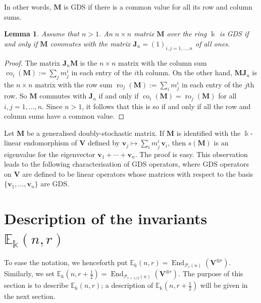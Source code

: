 \documentclass[10pt]{article}
\newtheorem{lemm}[theorem]{Lemma}
\theoremstyle{definition}
\DeclareMathOperator{\End}{End}
\DeclareMathOperator{\co}{co}
\DeclareMathOperator{\ro}{ro}
\newcommand{\E}{\mathbb{E}}
\newcommand{\Ptn}{\mathcal{P}}
\newcommand{\bM}{\mathbf{M}}
\newcommand{\bJ}{\mathbf{J}}
\newcommand{\V}{\mathbf{V}} %
\newcommand{\bv}{\mathbf{v}} %
\newcommand{\half}{\, 1/2} %
\newcommand{\fhalf}{\frac{1}{2}} %
\begin{document}
In other words, $\bM$ is GDS if there is a common value for all its
row and column sums. 

\begin{lemm}\label{lem:GDS}
 Assume that $n > 1$. An $n \times n$ matrix $\bM$ over the ring
 $\Bbbk$ is GDS if and only if $\bM$ commutes with the matrix $\bJ_n =
 (1)_{i,j=1,\dots, n}$ of all ones.
\end{lemm}

\begin{proof}
The matrix $\bJ_n \bM$ is the $n \times n$ matrix with the column sum
$\co_i(\bM) := \sum_j m^i_j$ in each entry of the $i$th column. On the
other hand, $\bM \bJ_n$ is the $n \times n$ matrix with the row sum
$\ro_j(\bM) := \sum_i m^i_j$ in each entry of the $j$th row. So $\bM$
commutes with $\bJ_n$ if and only if $\co_i(\bM) = \ro_j(\bM)$ for all
$i,j = 1, \dots, n$. Since $n > 1$, it follows that this is so if and
only if all the row and column sums have a common value.
\end{proof}

Let $\bM$ be a generalised doubly-stochastic matrix. 
If $\bM$ is identified with the $\Bbbk$-linear endomorphism of $\V$
defined by $\bv_j \mapsto \sum_i m^i_j \, \bv_i$, then $s(\bM)$ is an
eigenvalue for the eigenvector $\bv_1 + \cdots + \bv_n$. The proof is
easy. This observation leads to the following characterisation of GDS
operators, where GDS operators on $\V$ are defined to be linear
operators whose matrices with respect to the basis $\{\bv_1, \dots,
\bv_n\}$ are GDS.

\section{Description of the invariants \texorpdfstring{$\E_\Bbbk(n,r)$}{Ek (n,r)}}%
\label{sec:invariants}%
To ease the notation, we henceforth put $\E_\Bbbk(n,r)
= \End_{\Ptn_r(n)}(\V^{\otimes r})$. Similarly, we set
$\E_\Bbbk(n,r+\fhalf) = \End_{\Ptn_{r+\half}(n)}(\V^{\otimes r})$. The
purpose of this section is to describe $\E_\Bbbk(n,r)$; a description
of $\E_\Bbbk(n,r+\fhalf)$ will be given in the next section.
\end{document}
